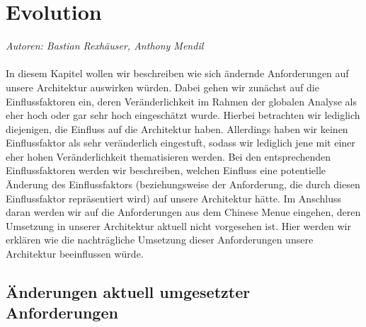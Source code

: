\documentclass[enabledeprecatedfontcommands,fontsize=11pt,paper=a4,twoside]{scrartcl}
\begin{document}



\newpage
\section{Evolution}
\label{sec:evolution}
\emph{Autoren: Bastian Rexhäuser, Anthony Mendil}\\\\
In diesem Kapitel wollen wir beschreiben wie sich ändernde Anforderungen auf unsere Architektur auswirken würden. Dabei gehen wir zunächst auf die Einflussfaktoren ein, deren Veränderlichkeit im Rahmen der globalen Analyse als eher hoch oder gar sehr hoch eingeschätzt wurde. Hierbei betrachten wir lediglich diejenigen, die Einfluss auf die Architektur haben. Allerdings haben wir keinen Einflussfaktor als sehr veränderlich eingestuft, sodass wir lediglich jene mit einer eher hohen Veränderlichkeit thematisieren werden. Bei den entsprechenden Einflussfaktoren werden wir beschreiben, welchen Einfluss eine potentielle Änderung des Einflussfaktors (beziehungsweise der Anforderung, die durch diesen Einflussfaktor repräsentiert wird) auf unsere Architektur hätte. Im Anschluss daran werden wir auf die Anforderungen aus dem Chinese Menue eingehen, deren Umsetzung in unserer Architektur aktuell nicht vorgesehen ist. Hier werden wir erklären wie die nachträgliche Umsetzung dieser Anforderungen unsere Architektur beeinflussen würde. \\ 
 
\subsection{Änderungen aktuell umgesetzter Anforderungen}
\end{document}
